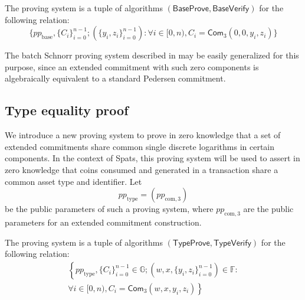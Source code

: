 \documentclass{article}
\newcommand{\G}{\mathbb{G}}
\newcommand{\F}{\mathbb{F}}
\newcommand{\func}[1]{\mathsf{#1}}
\newcommand{\com}{\func{Com}}
\begin{document}
The proving system is a tuple of algorithms $(\func{BaseProve}, \func{BaseVerify})$ for the following relation:
$$\{ pp_{\text{base}}, \{C_i\}_{i=0}^{n-1} ; (\{y_i, z_i\}_{i=0}^{n-1}) : \forall i \in [0,n), C_i = \com_3(0, 0, y_i, z_i) \}$$

The batch Schnorr proving system described in \cite{batch_schnorr} may be easily generalized for this purpose, since an extended commitment with such zero components is algebraically equivalent to a standard Pedersen commitment.


\subsection{Type equality proof}

We introduce a new proving system to prove in zero knowledge that a set of extended commitments share common single discrete logarithms in certain components.
In the context of Spats, this proving system will be used to assert in zero knowledge that coins consumed and generated in a transaction share a common asset type and identifier.
Let $$pp_{\text{type}} = (pp_{\text{com},3})$$ be the public parameters of such a proving system, where $pp_{\text{com},3}$ are the public parameters for an extended commitment construction.

The proving system is a tuple of algorithms $(\func{TypeProve}, \func{TypeVerify})$ for the following relation:
\begin{multline*}
\left\{ pp_{\text{type}}, \{C_i\}_{i=0}^{n-1} \in \G ; (w, x, \{y_i, z_i\}_{i=0}^{n-1}) \in \F : \right. \\
\left. \forall i \in [0,n), C_i = \com_3(w, x, y_i, z_i) \right\}
\end{multline*}
\end{document}
